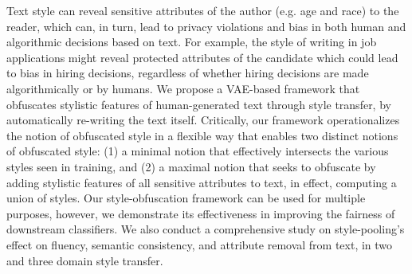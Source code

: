 Text style can reveal sensitive attributes of the author (e.g. age and race) to the reader, which can, in turn, lead to privacy violations and bias in both human and algorithmic decisions based on text. For example, the style of writing in job applications might reveal protected attributes of the candidate which could lead to bias in hiring decisions, regardless of whether hiring decisions are made algorithmically or by humans. We propose a VAE-based framework that obfuscates stylistic features of human-generated text through style transfer, by automatically re-writing the text itself. Critically, our framework operationalizes the notion of obfuscated style in a flexible way that enables two distinct notions of obfuscated style: (1) a minimal notion that effectively intersects the various styles seen in training, and (2) a maximal notion that seeks to obfuscate by adding stylistic features of all sensitive attributes to text, in effect, computing a union of styles. Our style-obfuscation framework can be used for multiple purposes, however, we demonstrate its effectiveness in improving the fairness of downstream classifiers. We also conduct a comprehensive study on style-pooling's effect on fluency, semantic consistency, and attribute removal from text, in two and three domain style transfer.
